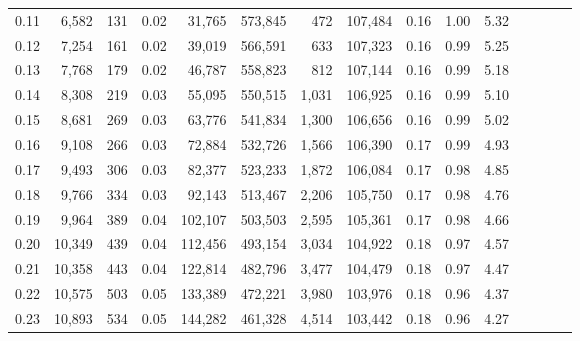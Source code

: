 \begin{tabular}{rrrcrrrrrrrrrrr}
0.11 &   6,582 &    131 &                                       0.02 &   31,765 &  573,845 &      472 &  107,484 &  0.16 &  1.00 &                         5.32 \\
0.12 &   7,254 &    161 &                                       0.02 &   39,019 &  566,591 &      633 &  107,323 &  0.16 &  0.99 &                         5.25 \\
0.13 &   7,768 &    179 &                                       0.02 &   46,787 &  558,823 &      812 &  107,144 &  0.16 &  0.99 &                         5.18 \\
0.14 &   8,308 &    219 &                                       0.03 &   55,095 &  550,515 &    1,031 &  106,925 &  0.16 &  0.99 &                         5.10 \\
0.15 &   8,681 &    269 &                                       0.03 &   63,776 &  541,834 &    1,300 &  106,656 &  0.16 &  0.99 &                         5.02 \\
0.16 &   9,108 &    266 &                                       0.03 &   72,884 &  532,726 &    1,566 &  106,390 &  0.17 &  0.99 &                         4.93 \\
0.17 &   9,493 &    306 &                                       0.03 &   82,377 &  523,233 &    1,872 &  106,084 &  0.17 &  0.98 &                         4.85 \\
0.18 &   9,766 &    334 &                                       0.03 &   92,143 &  513,467 &    2,206 &  105,750 &  0.17 &  0.98 &                         4.76 \\
0.19 &   9,964 &    389 &                                       0.04 &  102,107 &  503,503 &    2,595 &  105,361 &  0.17 &  0.98 &                         4.66 \\
0.20 &  10,349 &    439 &                                       0.04 &  112,456 &  493,154 &    3,034 &  104,922 &  0.18 &  0.97 &                         4.57 \\
0.21 &  10,358 &    443 &                                       0.04 &  122,814 &  482,796 &    3,477 &  104,479 &  0.18 &  0.97 &                         4.47 \\
0.22 &  10,575 &    503 &                                       0.05 &  133,389 &  472,221 &    3,980 &  103,976 &  0.18 &  0.96 &                         4.37 \\
0.23 &  10,893 &    534 &                                       0.05 &  144,282 &  461,328 &    4,514 &  103,442 &  0.18 &  0.96 &                         4.27 \\

\end{tabular}
